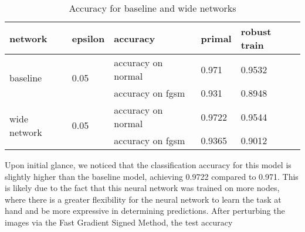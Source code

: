 \documentclass{article}
\begin{document}
\begin{table}[H]
\centering
\begin{tabular}{|l|l|l|l|l|}
\hline
network                       & epsilon               & accuracy           & primal & robust train \\ \hline
\multirow{2}{*}{baseline}     & \multirow{2}{*}{0.05} & accuracy on normal & 0.971  & 0.9532       \\ \cline{3-5} 
                              &                       & accuracy on fgsm   & 0.931  & 0.8948       \\ \hline
\multirow{2}{*}{wide network} & \multirow{2}{*}{0.05} & accuracy on normal & 0.9722 & 0.9544       \\ \cline{3-5} 
                              &                       & accuracy on fgsm   & 0.9365 & 0.9012       \\ \hline
\end{tabular}
\caption{Accuracy for baseline and wide networks}
\end{table}

Upon initial glance, we noticed that the classification accuracy for this model is slightly 
higher than the baseline model, achieving 0.9722 compared to 0.971. This is likely due to the fact 
that this neural network was trained on more nodes, where there is a greater flexibility for the 
neural network to learn the task at hand and be more expressive in determining predictions. After perturbing the images via the Fast Gradient Signed Method, the test accuracy 
\end{document}
